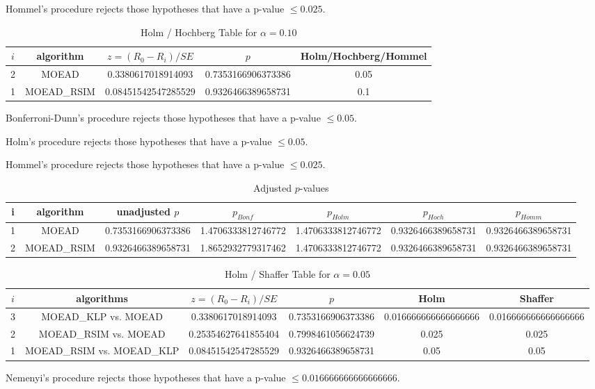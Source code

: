 \documentclass[a4paper,10pt]{article}
\begin{document}
\begin{landscape}
Hommel's procedure rejects those hypotheses that have a p-value $\le0.025$.


\begin{table}[!htp]
\centering\tiny
\caption{Holm / Hochberg Table for $\alpha=0.10$}
\begin{tabular}{ccccc}
$i$&algorithm&$z=(R_0 - R_i)/SE$&$p$&Holm/Hochberg/Hommel\\
\hline
2&MOEAD&0.3380617018914093&0.7353166906373386&0.05\\
1&MOEAD_RSIM&0.08451542547285529&0.9326466389658731&0.1\\
\hline
\end{tabular}
\end{table}
Bonferroni-Dunn's procedure rejects those hypotheses that have a p-value $\le0.05$.


Holm's procedure rejects those hypotheses that have a p-value $\le0.05$.


Hommel's procedure rejects those hypotheses that have a p-value $\le0.025$.


\begin{table}[!htp]
\centering\tiny
\caption{Adjusted $p$-values}
\begin{tabular}{ccccccc}
i&algorithm&unadjusted $p$&$p_{Bonf}$&$p_{Holm}$&$p_{Hoch}$&$p_{Homm}$\\
\hline
1&MOEAD&0.7353166906373386&1.4706333812746772&1.4706333812746772&0.9326466389658731&0.9326466389658731\\
2&MOEAD_RSIM&0.9326466389658731&1.8652932779317462&1.4706333812746772&0.9326466389658731&0.9326466389658731\\
\hline
\end{tabular}
\end{table}

\begin{table}[!htp]
\centering\tiny
\caption{Holm / Shaffer Table for $\alpha=0.05$}
\begin{tabular}{cccccc}
$i$&algorithms&$z=(R_0 - R_i)/SE$&$p$&Holm&Shaffer\\
\hline
3&MOEAD_KLP vs. MOEAD&0.3380617018914093&0.7353166906373386&0.016666666666666666&0.016666666666666666\\
2&MOEAD_RSIM vs. MOEAD&0.25354627641855404&0.7998461056624739&0.025&0.025\\
1&MOEAD_RSIM vs. MOEAD_KLP&0.08451542547285529&0.9326466389658731&0.05&0.05\\
\hline
\end{tabular}
\end{table}
Nemenyi's procedure rejects those hypotheses that have a p-value $\le0.016666666666666666$.



\end{landscape}
\end{document}
